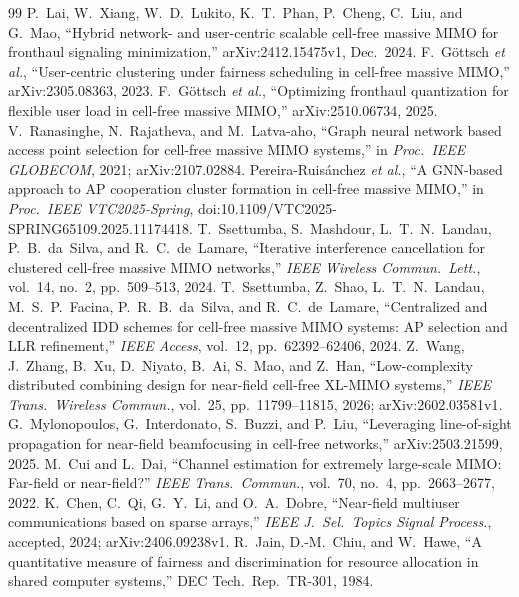 \documentclass[11pt]{article}
\begin{document}
\begin{thebibliography}{99}
 P.~Lai, W.~Xiang, W.~D.~Lukito, K.~T.~Phan, P.~Cheng, C.~Liu, and G.~Mao, ``Hybrid network- and user-centric scalable cell-free massive MIMO for fronthaul signaling minimization,'' arXiv:2412.15475v1, Dec.\ 2024.
 F.~G\"ottsch \emph{et al.}, ``User-centric clustering under fairness scheduling in cell-free massive MIMO,'' arXiv:2305.08363, 2023.
 F.~G\"ottsch \emph{et al.}, ``Optimizing fronthaul quantization for flexible user load in cell-free massive MIMO,'' arXiv:2510.06734, 2025.
 V.~Ranasinghe, N.~Rajatheva, and M.~Latva-aho, ``Graph neural network based access point selection for cell-free massive MIMO systems,'' in \emph{Proc.\ IEEE GLOBECOM}, 2021; arXiv:2107.02884.
 Pereira-Ruis\'anchez \emph{et al.}, ``A GNN-based approach to AP cooperation cluster formation in cell-free massive MIMO,'' in \emph{Proc.\ IEEE VTC2025-Spring}, doi:10.1109/VTC2025-SPRING65109.2025.11174418.
 T.~Ssettumba, S.~Mashdour, L.~T.~N.~Landau, P.~B.~da~Silva, and R.~C.~de~Lamare, ``Iterative interference cancellation for clustered cell-free massive MIMO networks,'' \emph{IEEE Wireless Commun.\ Lett.}, vol.~14, no.~2, pp.~509--513, 2024.
 T.~Ssettumba, Z.~Shao, L.~T.~N.~Landau, M.~S.~P.~Facina, P.~R.~B.~da~Silva, and R.~C.~de~Lamare, ``Centralized and decentralized IDD schemes for cell-free massive MIMO systems: AP selection and LLR refinement,'' \emph{IEEE Access}, vol.~12, pp.~62392--62406, 2024.
 Z.~Wang, J.~Zhang, B.~Xu, D.~Niyato, B.~Ai, S.~Mao, and Z.~Han, ``Low-complexity distributed combining design for near-field cell-free XL-MIMO systems,'' \emph{IEEE Trans.\ Wireless Commun.}, vol.~25, pp.~11799--11815, 2026; arXiv:2602.03581v1.
 G.~Mylonopoulos, G.~Interdonato, S.~Buzzi, and P.~Liu, ``Leveraging line-of-sight propagation for near-field beamfocusing in cell-free networks,'' arXiv:2503.21599, 2025.
 M.~Cui and L.~Dai, ``Channel estimation for extremely large-scale MIMO: Far-field or near-field?'' \emph{IEEE Trans.\ Commun.}, vol.~70, no.~4, pp.~2663--2677, 2022.
 K.~Chen, C.~Qi, G.~Y.~Li, and O.~A.~Dobre, ``Near-field multiuser communications based on sparse arrays,'' \emph{IEEE J.\ Sel.\ Topics Signal Process.}, accepted, 2024; arXiv:2406.09238v1.
 R.~Jain, D.-M.~Chiu, and W.~Hawe, ``A quantitative measure of fairness and discrimination for resource allocation in shared computer systems,'' DEC Tech.\ Rep.\ TR-301, 1984.
\end{thebibliography}
\end{document}
